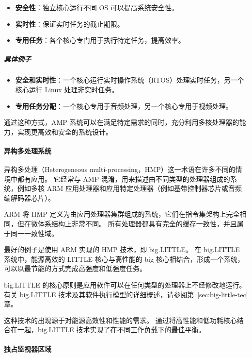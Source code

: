 \begin{itemize}

\item
  \textbf{安全性}：独立核心运行不同 OS 可以提高系统安全性。
\item
  \textbf{实时性}：保证实时任务的截止期限。
\item
  \textbf{专用任务}：各个核心专门用于执行特定任务，提高效率。
\end{itemize}

\subparagraph*{具体例子}

\begin{itemize}

\item
  \textbf{安全和实时性}：一个核心运行实时操作系统（RTOS）处理实时任务，另一个核心运行 Linux 处理非实时任务。
\item
  \textbf{专用任务分配}：一个核心专用于音频处理，另一个核心专用于视频处理。
\end{itemize}

通过这种方式，AMP 系统可以在满足特定需求的同时，充分利用多核处理器的能力，实现更高效和安全的系统设计。

\paragraph{异构多处理系统}

异构多处理（Heterogeneous multi-processing，HMP）这一术语在许多不同的情境中都有应用。
它经常与 AMP 混淆，用来描述由不同类型的处理器组成的系统，例如多核 ARM 应用处理器和应用特定处理器（例如基带控制器芯片或音频编解码器芯片）。

ARM 将 HMP 定义为由应用处理器集群组成的系统，它们在指令集架构上完全相同，但在微体系结构上非常不同。
所有处理器都具有完全的缓存一致性，并且属于同一一致性域。

最好的例子是使用 ARM 实现的 HMP 技术，即 big.LITTLE。
在 big.LITTLE 系统中，能源高效的 LITTLE 核心与高性能的 big 核心相结合，形成一个系统，可以以最节能的方式完成高强度和低强度任务。


big.LITTLE 的核心原则是应用软件可以在任何类型的处理器上不经修改地运行。
有关 big.LITTLE 技术及其软件执行模型的详细概述，请参阅第~\ref{sec:big-little-tec} 章。

这种技术的出现源于对能源高效性和性能的需求。
通过将高性能和低功耗核心结合在一起，big.LITTLE 技术实现了在不同工作负载下的最佳平衡。

\paragraph{独占监视器区域}

